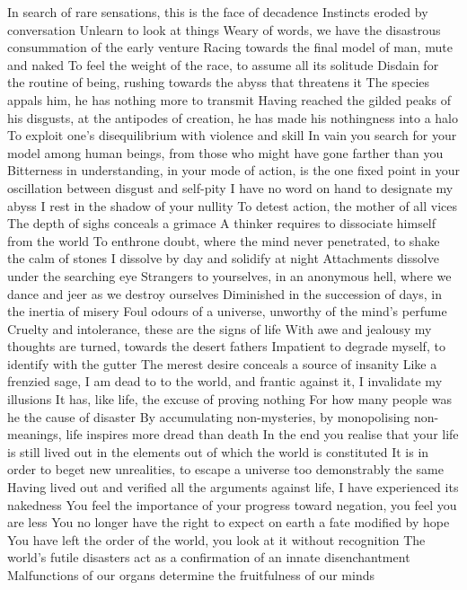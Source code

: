 \documentclass{article}
\begin{document}
In search of rare sensations, this is the face of decadence
Instincts eroded by conversation
Unlearn to look at things
Weary of words, we have the disastrous consummation of the early venture
Racing towards the final model of man, mute and naked
To feel the weight of the race, to assume all its solitude
Disdain for the routine of being, rushing towards the abyss that threatens it
The species appals him, he has nothing more to transmit
Having reached the gilded peaks of his disgusts, at the antipodes of creation, he has made his nothingness into a halo
To exploit one's disequilibrium with violence and skill
In vain you search for your model among human beings, from those who might have gone farther than you
Bitterness in understanding, in your mode of action, is the one fixed point in your oscillation between disgust and self-pity
I have no word on hand to designate my abyss
I rest in the shadow of your nullity
To detest action, the mother of all vices
The depth of sighs conceals a grimace
A thinker requires to dissociate himself from the world
To enthrone doubt, where the mind never penetrated, to shake the calm of stones
I dissolve by day and solidify at night
Attachments dissolve under the searching eye
Strangers to yourselves, in an anonymous hell, where we dance and jeer as we destroy ourselves
Diminished in the succession of days, in the inertia of misery
Foul odours of a universe, unworthy of the mind's perfume
Cruelty and intolerance, these are the signs of life
With awe and jealousy my thoughts are turned, towards the desert fathers
Impatient to degrade myself, to identify with the gutter
The merest desire conceals a source of insanity
Like a frenzied sage, I am dead to to the world, and frantic against it, I invalidate my illusions
It has, like life, the excuse of proving nothing
For how many people was he the cause of disaster
By accumulating non-mysteries, by monopolising non-meanings, life inspires more dread than death
In the end you realise that your life is still lived out in the elements out of which the world is constituted
It is in order to beget new unrealities, to escape a universe too demonstrably the same
Having lived out and verified all the arguments against life, I have experienced its nakedness
You feel the importance of your progress toward negation, you feel you are less
You no longer have the right to expect on earth a fate modified by hope
You have left the order of the world, you look at it without recognition
The world's futile disasters act as a confirmation of an innate disenchantment
Malfunctions of our organs determine the fruitfulness of our minds
\end{document}
